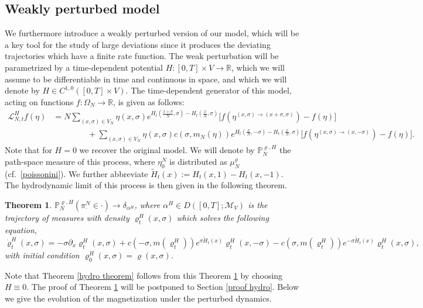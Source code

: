 \documentclass[11pt]{article}
\numberwithin{equation}{section}
\theoremstyle{definition}
\theoremstyle{plain}
\newtheorem{Theorem}{Theorem}[section]
\newcommand{\p}{\mathbb{P}}
\newcommand{\nn}{\nonumber}
\begin{document}
\subsection{Weakly perturbed model}\label{wam section}
We furthermore introduce a weakly perturbed version of our model, which will be a key tool for the study of large deviations since it produces the deviating trajectories which have a finite rate function. The weak perturbation will be parametrized by a time-dependent potential $H:[0,T]\times V \to \mathbb{R}$, which we will assume to be differentiable in time and continuous in space, and which we will denote by $H\in C^{1,0}([0,T]\times V)$. The time-dependent generator of this model, acting on functions $f:\Omega_N\to\mathbb{R}$, is given as follows:
\begin{align}\label{weak asym gen}
    \mathscr{L}^H_{N,t} f(\eta)  &= N \sum_{(x,\sigma)\in V_N} \eta(x,\sigma)e^{H_t(\frac{x+\sigma}{N},\sigma ) - H_t(\frac{x}{N},\sigma) }  \big[f(\eta^{(x,\sigma)\to (x+\sigma,\sigma)}) - f(\eta)\big]\\
    &\nn\ \ \ \ \ \ \ \ \ \ \ \ \ \ \ \ \ \ \ + \sum_{(x,\sigma)\in V_N}  \eta(x,\sigma)c(\sigma,m_N(\eta))e^{H_t(\frac{x}{N},-\sigma) - H_t(\frac{x}{N},\sigma)}\big[f(\eta^{(x,\sigma)\to(x,-\sigma)})-f(\eta)\big].
\end{align}
Note that for $H=0$ we recover the original model.
We will denote by $\p_N^{\varrho,H}$ the path-space measure of this process, where $\eta^N_0$ is distributed as $\mu^{\varrho}_N$ (cf.\ \eqref{poissonini}). We further abbreviate  $\widetilde{H}_t(x) := H_t(x,1) - H_t(x,-1)$. The hydrodynamic limit of this process is then given in the following theorem. 
\begin{Theorem}\label{weak hydro theorem}
    $\p^{\varrho,H}_N(\pi^N_{\cdot}\in \cdot) \to \delta_{\alpha^H}$, where $\alpha^H\in D([0,T];\mathcal{M}_V)$ is the trajectory of measures with density $\varrho^H_t(x,\sigma)$ 
    which solves the following  equation,
    \begin{equation}\label{weak-PDE}
            \dot{\varrho}^H_t(x,\sigma) = -\sigma \partial_x \varrho^H_t(x,\sigma) + c(-\sigma,m(\varrho^H_t))e^{\sigma \widetilde{H}_t(x)}\varrho^H_t(x,-\sigma) - c(\sigma,m(\varrho^H_t))e^{-\sigma \widetilde{H}_t(x)}\varrho^H_t(x,\sigma),
    \end{equation}
    with initial condition $\varrho^H_0(x,\sigma) = \varrho(x,\sigma)$.
\end{Theorem}
Note that Theorem \ref{hydro theorem}  follows from this Theorem \ref{weak hydro theorem} by choosing $H\equiv 0$. The proof of  Theorem \ref{weak hydro theorem} will be postponed to Section \ref{proof hydro}. Below we give the evolution of the magnetization under the perturbed dynamics. 
\end{document}
